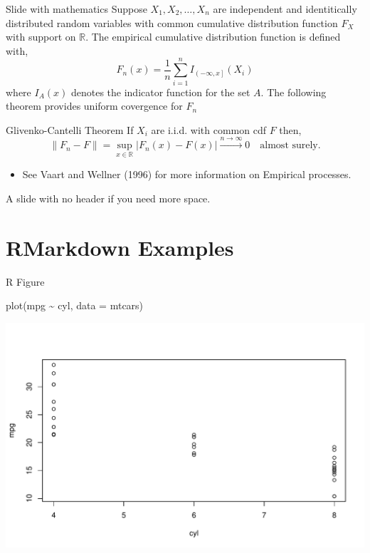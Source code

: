 \documentclass[10pt,ignorenonframetext,aspectratio=169]{beamer}
\newenvironment{Shaded}{\begin{snugshade}}{\end{snugshade}}
\newcommand{\AttributeTok}[1]{\textcolor[rgb]{0.77,0.63,0.00}{#1}}
\newcommand{\FunctionTok}[1]{\textcolor[rgb]{0.00,0.00,0.00}{#1}}
\newcommand{\NormalTok}[1]{#1}
\newcommand{\SpecialCharTok}[1]{\textcolor[rgb]{0.00,0.00,0.00}{#1}}
\providecommand{\tightlist}{%
  \setlength{\itemsep}{0pt}\setlength{\parskip}{0pt}}
\renewenvironment{Shaded}{\color{black}\begin{snugshade}\color{black}}{\end{snugshade}}
\begin{document}
\begin{frame}{Slide with mathematics}
\protect\hypertarget{slide-with-mathematics}{}
Suppose \(X_1, X_2, \ldots, X_n\) are independent and identitically
distributed random variables with common cumulative distribution
function \(F_X\) with support on \(\mathbb{R}\). The empirical
cumulative distribution function is defined with, \[
  F_n(x) = \frac{1}{n}\sum_{i = 1}^n I_{\left( -\infty, x\right]}(X_i)
\] where \(I_A(x)\) denotes the indicator function for the set \(A\).
The following theorem provides uniform covergence for \(F_n\)

\begin{block}{Glivenko-Cantelli Theorem}
\protect\hypertarget{glivenko-cantelli-theorem}{}
If \(X_i\) are i.i.d. with common cdf \(F\) then, \[
  \left\| F_n - F \right\| = \sup_{x \in \mathbb{R}} |F_n(x) - F(x)| \stackrel{n \to \infty}{\longrightarrow} 0\quad \text{almost surely.}
\]
\end{block}

\begin{itemize}[<+->]
\tightlist
\item
  See Vaart and Wellner (1996) for more information on Empirical
  processes.
\end{itemize}
\end{frame}

\begin{frame}
A slide with no header if you need more space.
\end{frame}

\hypertarget{rmarkdown-examples}{%
\section{RMarkdown Examples}\label{rmarkdown-examples}}

\begin{frame}[fragile]{R Figure}
\protect\hypertarget{r-figure}{}
\begin{Shaded}
\begin{Highlighting}[]
\FunctionTok{plot}\NormalTok{(mpg }\SpecialCharTok{\textasciitilde{}}\NormalTok{ cyl, }\AttributeTok{data =}\NormalTok{ mtcars)}
\end{Highlighting}
\end{Shaded}

\includegraphics{Untitled_files/figure-beamer/mtcarsboxplot-1.pdf}
\end{frame}
\end{document}
